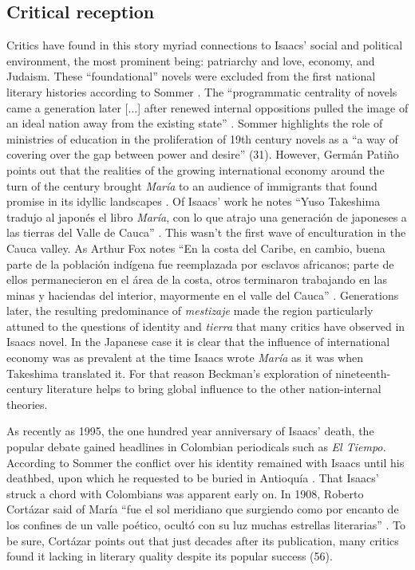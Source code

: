 \subsection{Critical reception}
Critics have found in this story myriad connections to Isaacs' social and political environment, the most prominent being: patriarchy and love, economy,  and Judaism.
These \enquote{foundational} novels were excluded from the first national literary histories according to Sommer \autocite{Sommer1991}. 
The \enquote{programmatic centrality of novels came a generation later [...] after renewed internal oppositions pulled the image of an ideal nation away from the existing state} \autocite[30]{Sommer1991}.
Sommer highlights the role of ministries of education in the proliferation of 19th century novels as a \enquote{a way of covering over the gap between power and desire} (31). 
However, Germán Patiño points out that the realities of the growing international economy around the turn of the century brought \textit{María} to an audience of immigrants that found promise in its idyllic landscapes \nocite{Patino1992}. 
Of Isaacs' work he notes \enquote{Yuso Takeshima tradujo al japonés el libro \textit{María}, con lo que atrajo una generación de japoneses a las tierras del Valle de Cauca} \autocite[37]{Patino1992}.
This wasn't the first wave of enculturation in the Cauca valley.
As Arthur Fox notes \enquote{En la costa del Caribe, en cambio, buena parte de la población indígena fue reemplazada por esclavos africanos; parte de ellos permanecieron en el área de la costa, otros terminaron trabajando en las minas y haciendas del interior, mayormente en el valle del Cauca} \autocite[333]{Fox2011}. 
Generations later, the resulting predominance of \textit{mestizaje} made the region particularly attuned to the questions of identity and \textit{tierra} that many critics have observed in Isaacs novel. 
In the Japanese case it is clear that the influence of international economy was as prevalent at the time Isaacs wrote \textit{María} as it was when Takeshima translated it. 
For that reason Beckman's exploration of nineteenth-century literature helps to bring global influence to the other nation-internal theories.


As recently as 1995, the one hundred year anniversary of Isaacs' death, the popular debate gained headlines in Colombian periodicals such as \textit{El Tiempo.}
According to Sommer  the conflict over his identity remained with Isaacs until his deathbed, upon which he requested to be buried in Antioquía \autocite[268]{Sommer1997}.
That Isaacs' struck a chord with Colombians was apparent early on. In 1908, Roberto Cortázar said of María \enquote{fue el sol meridiano que surgiendo como por encanto de los confines de un valle poético, ocultó con su luz muchas estrellas literarias} \autocite[55]{Cortazar1908}. 
To be sure, Cortázar points out that just decades after its publication, many critics found it lacking in literary quality despite its popular success (56)\nocite{Cortazar1908}.



